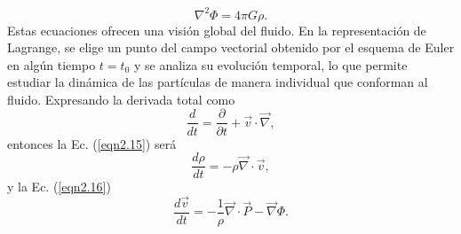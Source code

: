 \documentclass[a4paper,openright,12pt]{book}
\begin{document}
\begin{equation}
 \nabla^{2}\Phi = 4 \pi G \rho.\label{eqn2.17}
\end{equation}
Estas ecuaciones ofrecen una visión global del fluido. En la representación de Lagrange, se elige un punto del campo vectorial obtenido por el esquema de Euler en algún tiempo $t = t_{0}$ y se analiza su evolución temporal, lo que permite estudiar la dinámica de las partículas de manera individual que conforman al fluido. Expresando la derivada total como
\begin{equation}
 \frac{d}{dt}
 =
 \frac{\partial }{\partial t} 
 +
 \vec{v}\cdot\vec{\nabla},\label{eqn2.18}
\end{equation}
entonces la Ec. (\ref{eqn2.15}) será
\begin{equation}
 \frac{d \rho}{d t}
 =
 - \rho \vec{\nabla}\cdot\vec{v},\label{eqn2.19}
\end{equation}
y la Ec. (\ref{eqn2.16})
\begin{equation}
 \frac{d \vec{v}}{d t} 
 =
 -\frac{1}{\rho}\vec{\nabla}\cdot\vec{P} - \vec{\nabla}\Phi.\label{eqn2.20}
\end{equation}
\end{document}
